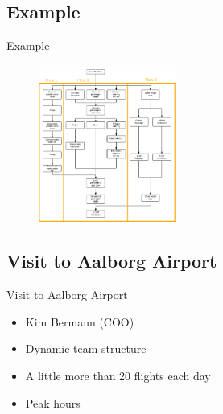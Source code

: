 \subsection{Example}
\begin{frame}{Example}
\begin{figure}
    \centering
    \includegraphics[width=170px]{Grafik/TestCase3Illu}
\end{figure}
\end{frame}

\subsection{Visit to Aalborg Airport}
\begin{frame}{Visit to Aalborg Airport}
\begin{itemize}
	\item Kim Bermann (COO)
	\item Dynamic team structure
	\item A little more than 20 flights each day
	\item Peak hours 	
\end{itemize}
\end{frame}